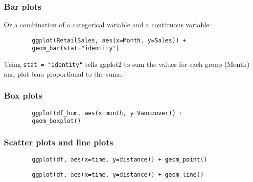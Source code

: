 \documentclass{beamer}
\begin{document}
	\begin{frame}[fragile]
		\frametitle{Bar plots}

		Or a combination of a categorical variable and a continuous variable:

		\begin{exampleblock}{}
		\begin{center}
		\begin{BVerbatim}
		ggplot(RetailSales, aes(x=Month, y=Sales)) + 
		geom_bar(stat="identity")
		\end{BVerbatim}
		\end{center}
		\end{exampleblock}{}

		Using \verb|stat = "identity"| tells ggplot2 to sum the values for each group (Month) and plot bars proportional to the sums.
		
	\end{frame}

	\begin{frame}[fragile]
		\frametitle{Box plots}


		\begin{exampleblock}{}
		\begin{center}
		\begin{BVerbatim}
		ggplot(df_hum, aes(x=month, y=Vancouver)) + 
		geom_boxplot()
		\end{BVerbatim}
		\end{center}
		\end{exampleblock}{}
		
	\end{frame}

	\begin{frame}[fragile]
		\frametitle{Scatter plots and line plots}

		\begin{exampleblock}{}
		\begin{center}
		\begin{BVerbatim}
		ggplot(df, aes(x=time, y=distance)) + geom_point()
		\end{BVerbatim}
		\end{center}
		\end{exampleblock}{}

		\begin{exampleblock}{}
		\begin{center}
		\begin{BVerbatim}
		ggplot(df, aes(x=time, y=distance)) + geom_line()
		\end{BVerbatim}
		\end{center}
		\end{exampleblock}{}
		
	\end{frame}
\end{document}
